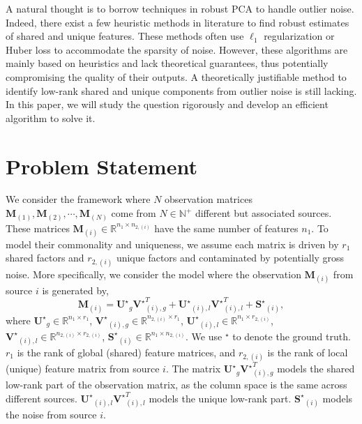 \documentclass[twoside,11pt]{article}
\newcommand{\matM}{\mathbf{M}}
\newcommand{\matSst}{{\mathbf{S}^\star}}
\newcommand{\matUst}{{\mathbf{U}^\star}}
\newcommand{\matVst}{{\mathbf{V}^\star}}
\begin{document}
A natural thought is to borrow techniques in robust PCA to handle outlier noise. Indeed, there exist a few heuristic methods in literature \citep{rjive,rcica,rajive} to find robust estimates of shared and unique features. These methods often use $\ell_1$ regularization \citep{rjive,rcica} or Huber loss \citep{rajive} to accommodate the sparsity of noise. However, these algorithms are mainly based on heuristics and lack theoretical guarantees, thus potentially compromising the quality of their outputs. A theoretically justifiable method to identify low-rank shared and unique components from outlier noise is still lacking. In this paper, we will study the question rigorously and develop an efficient algorithm to solve it.

\section{Problem Statement}
\label{sec:problemstatement}
We consider the framework where $N$ observation matrices $\matM_{(1)}, \matM_{(2)},\cdots,\matM_{(N)}$ come from $N\in \mathbb{N}^+$ different but associated sources. These matrices $\matM_{(i)}\in \mathbb{R}^{n_1\times n_{2,(i)}}$ have the same number of features $n_1$. To model their commonality and uniqueness, we assume each matrix is driven by $r_1$ shared factors and $r_{2,(i)}$ unique factors and contaminated by potentially gross noise. More specifically, we consider the model where the observation $\matM_{(i)}$ from source $i$ is generated by,
\begin{equation}
\label{eqn:matrixmodel}
    \matM_{(i)} = \matUst_g\matVst_{(i),g}^T+\matUst_{(i),l}\matVst_{(i),l}^T + \matSst_{(i)},
\end{equation} 
where $\matUst_g\in \mathbb{R}^{n_1\times r_1}$, $\matVst_{(i),g}\in \mathbb{R}^{n_{2,(i)}\times r_1}$, $\matUst_{(i),l}\in \mathbb{R}^{n_1\times r_{2,(i)}}$, $\matVst_{(i),l}\in \mathbb{R}^{n_{2,(i)}\times r_{2,(i)}}$, $\matSst_{(i)}\in \mathbb{R}^{n_1\times n_{2,(i)}}$. We use ${}^{\star}$ to denote the ground truth. $r_1$ is the rank of global (shared) feature matrices, and $r_{2,(i)}$ is the rank of local (unique) feature matrix from source $i$. The matrix $\matUst_g\matVst_{(i),g}^T$ models the shared low-rank part of the observation matrix, as the column space is the same across different sources. $\matUst_{(i),l}\matVst_{(i),l}^T$ models the unique low-rank part. %
$\matSst_{(i)}$ models the noise from source $i$. 
\end{document}
